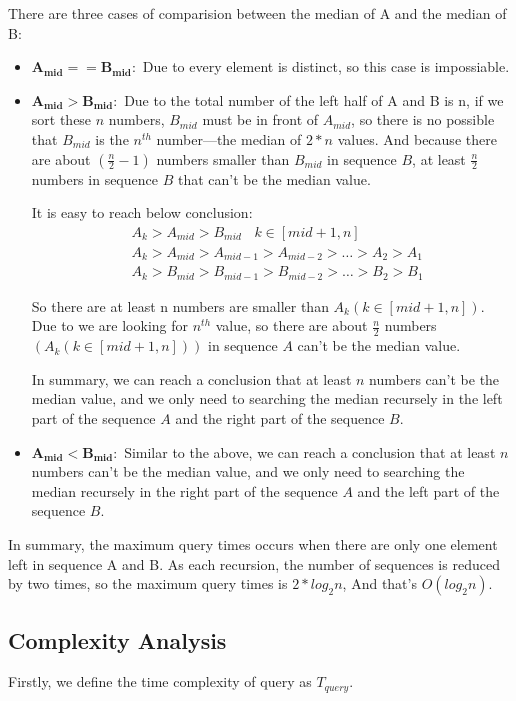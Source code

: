 \documentclass[UTF8,a4paper,12pt]{article}
\begin{document}
		There are three cases of comparision between the median of A and the median of B:
		\begin{itemize}
			\item $\bm{ A_{mid}==B_{mid} :}$ Due to every element is distinct, so this case is impossiable.
			\item $\bm{ A_{mid}>B_{mid} :}$ Due to the total number of the left half of A and B is n, if we sort these $ n $ numbers, $ B_{mid} $ must be in front of $ A_{mid} $, so there is no possible that $ B_{mid} $ is the $ n^{th} $ number---the median of $ 2*n $ values. And because there are about $ (\frac{n}{2}-1) $ numbers smaller than $ B_{mid} $ in sequence $ B $, at least $ \frac{n}{2} $ numbers in sequence $ B $ that can't be the median value. 
			
			\setlength{\parindent}{2em}It is easy to reach below conclusion:
			\begin{align*}
			&  A_{k}>A_{mid}>B_{mid}\ \ \ \  k\in[mid+1,n]\\
			&  A_{k}>A_{mid}>A_{mid-1}>A_{mid-2}>\dots>A_{2}>A_{1} \\
			&  A_{k}>B_{mid}>B_{mid-1}>B_{mid-2}>\dots>B_{2}>B_{1}
			\end{align*}
			
			\setlength{\parindent}{2em}So there are at least n numbers are smaller than $ A_{k}(k\in[mid+1,n]) $. Due to we are looking for $ n^{th} $ value, so there are about $ \frac{n}{2} $ numbers $( A_{k} (k\in[mid+1,n]))$ in sequence $ A $ can't be the median value.
			
			\setlength{\parindent}{2em}In summary, we can reach a conclusion that at least $ n $ numbers can't be the median value, and we only need to searching the median recursely in the left part of the sequence $ A $ and the right part of the sequence $ B $.
			
			\item $\bm{A_{mid}<B_{mid} : }$ Similar to the above, we can reach a conclusion that at least $ n $ numbers can't be the median value, and we only need to searching the median recursely in the right part of the sequence $ A $ and the left part of the sequence $ B $.
		\end{itemize}
		
		In summary, the maximum query times occurs when there are only one element left in sequence A and B. As each recursion, the number of sequences is reduced by two times, so the maximum query times is $ 2*log_2{n} $, And that's $ O(log_2{n}) $.
		
	\subsection{Complexity Analysis}
		Firstly, we define the time complexity of query as $ T_{query} $.
	
\end{document}
